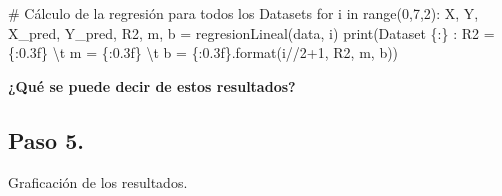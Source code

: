 \documentclass[
  letterpaper,
  DIV=11,
  numbers=noendperiod]{scrreprt}
\newenvironment{Shaded}{\begin{snugshade}}{\end{snugshade}}
\newcommand{\BuiltInTok}[1]{\textcolor[rgb]{0.00,0.23,0.31}{#1}}
\newcommand{\CharTok}[1]{\textcolor[rgb]{0.13,0.47,0.30}{#1}}
\newcommand{\CommentTok}[1]{\textcolor[rgb]{0.37,0.37,0.37}{#1}}
\newcommand{\ControlFlowTok}[1]{\textcolor[rgb]{0.00,0.23,0.31}{#1}}
\newcommand{\DecValTok}[1]{\textcolor[rgb]{0.68,0.00,0.00}{#1}}
\newcommand{\KeywordTok}[1]{\textcolor[rgb]{0.00,0.23,0.31}{#1}}
\newcommand{\NormalTok}[1]{\textcolor[rgb]{0.00,0.23,0.31}{#1}}
\newcommand{\OperatorTok}[1]{\textcolor[rgb]{0.37,0.37,0.37}{#1}}
\newcommand{\SpecialCharTok}[1]{\textcolor[rgb]{0.37,0.37,0.37}{#1}}
\newcommand{\StringTok}[1]{\textcolor[rgb]{0.13,0.47,0.30}{#1}}
\begin{document}
\begin{Shaded}
\begin{Highlighting}[]
\CommentTok{\# Cálculo de la regresión para todos los Dataset\textquotesingle{}s}
\ControlFlowTok{for}\NormalTok{ i }\KeywordTok{in} \BuiltInTok{range}\NormalTok{(}\DecValTok{0}\NormalTok{,}\DecValTok{7}\NormalTok{,}\DecValTok{2}\NormalTok{):}
\NormalTok{    X, Y, X\_pred, Y\_pred, R2, m, b }\OperatorTok{=}\NormalTok{ regresionLineal(data, i)}
    \BuiltInTok{print}\NormalTok{(}\StringTok{\textquotesingle{}Dataset }\SpecialCharTok{\{:\}}\StringTok{ : R2 = }\SpecialCharTok{\{:0.3f\}}\StringTok{ }\CharTok{\textbackslash{}t}\StringTok{ m = }\SpecialCharTok{\{:0.3f\}}\StringTok{ }\CharTok{\textbackslash{}t}\StringTok{ b = }\SpecialCharTok{\{:0.3f\}}\StringTok{\textquotesingle{}}\NormalTok{.}\BuiltInTok{format}\NormalTok{(i}\OperatorTok{//}\DecValTok{2}\OperatorTok{+}\DecValTok{1}\NormalTok{, R2, m, b))}
\end{Highlighting}
\end{Shaded}

\textbf{¿Qué se puede decir de estos resultados?}

\subsection{Paso 5.}\label{paso-5.}

Graficación de los resultados.
\end{document}
